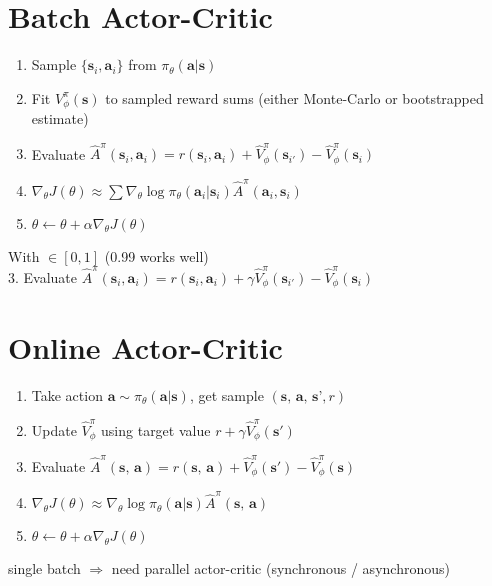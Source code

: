 \section{Batch Actor-Critic}
\begin{enumerate}
	\item {}Sample $\{\textbf{s}_i, \textbf{a}_i\}$ from $\pi_{\theta}(\textbf{a|s})$
	\item Fit $V_{\phi}^\pi(\textbf{s})$ to sampled reward sums (either Monte-Carlo \cite{schulman2015high} or bootstrapped estimate)
	\item Evaluate $\widehat{A}^\pi(\textbf{s}_i, \textbf{a}_i) = r(\textbf{s}_i, \textbf{a}_i) + \widehat{V}_\phi^\pi(\textbf{s}_{i'}) - \widehat{V}_\phi^\pi(\textbf{s}_{i})$
	\item $\nabla_\theta J(\theta) \approx \sum \nabla_\theta\log\pi_{\theta}( \textbf{a}_{i}|\textbf{s}_{i} ) \widehat{A}^\pi(\textbf{a}_i, \textbf{s}_i)$
	\item {}$\theta \leftarrow \theta + \alpha \nabla_\theta J(\theta)$
\end{enumerate}
With  $\in [0,1]$ (0.99 works well)\\
3. Evaluate $\widehat{A}^\pi(\textbf{s}_i, \textbf{a}_i) = r(\textbf{s}_i, \textbf{a}_i) + \gamma\widehat{V}_\phi^\pi(\textbf{s}_{i'}) - \widehat{V}_\phi^\pi(\textbf{s}_{i})$ \cite{thomas2014icml}

\section{Online Actor-Critic}
\begin{enumerate}
	\item {}Take action $\textbf{a} \sim \pi_{\theta}(\textbf{a|s})$, get sample $(\textbf{s, a, s'}, r)$
	\item Update $\widehat{V}_\phi^\pi$ using target value $r + \gamma \widehat{V}_\phi^\pi(\textbf{s}')$
	\item Evaluate $\widehat{A}^\pi(\textbf{s, a}) = r(\textbf{s, a}) + \widehat{V}_\phi^\pi(\textbf{s}') - \widehat{V}_\phi^\pi(\textbf{s})$
	\item $\nabla_\theta J(\theta) \approx \nabla_\theta\log\pi_{\theta}(\textbf{a|s}) \widehat{A}^\pi(\textbf{s, a})$
	\item {}$\theta \leftarrow \theta + \alpha \nabla_\theta J(\theta)$
\end{enumerate}
 single batch $\Rightarrow$ need parallel actor-critic (synchronous / asynchronous) \cite{mnih2016icml}

